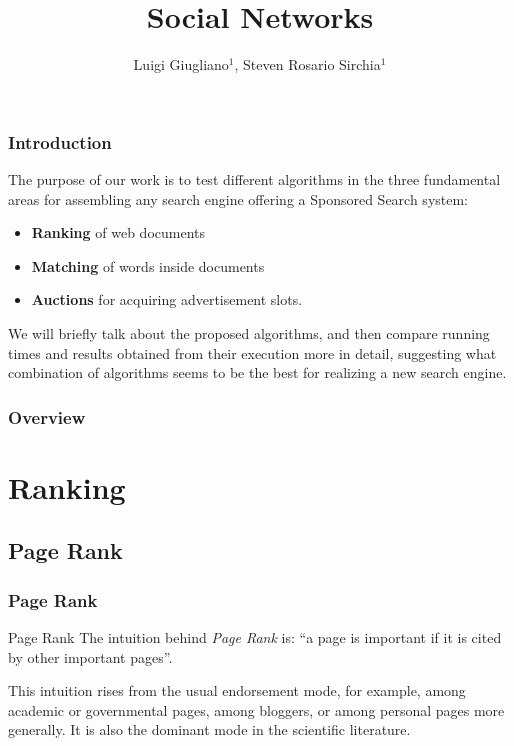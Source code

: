 \documentclass{beamer}
\title{Social Networks}
\author{Luigi Giugliano$^1$, Steven Rosario Sirchia$^1$}
\institute{$^1$Università degli studi di Salerno}
\begin{document}
\begin{frame}
   \maketitle
\end{frame}

\begin{frame}
\frametitle{Introduction}
The purpose of our work is to test different algorithms in the three fundamental areas for assembling any search engine offering a Sponsored Search system:
\begin{itemize}
\item \textbf{Ranking} of web documents
\item \textbf{Matching} of words inside documents
\item \textbf{Auctions} for acquiring advertisement slots.
\end{itemize}
We will briefly talk about the proposed algorithms, and then compare running times and results obtained from their execution more in detail, suggesting what combination of algorithms seems to be the best for realizing a new search engine.
\end{frame}

\begin{frame}
 \frametitle{Overview}
 \footnotesize \tableofcontents
 \end{frame}


\section{Ranking}
\subsection{Page Rank}
\begin{frame}
\frametitle{Page Rank}
\begin{block}{Page Rank}
The intuition behind \emph{Page Rank} is:
\center``a page is important if it is cited by other important pages''.
\end{block}
This intuition rises from the usual endorsement mode, for example, among academic or governmental pages, among bloggers, or among personal pages more generally. It is also the dominant mode in the scientific literature.
\end{frame}
\end{document}
